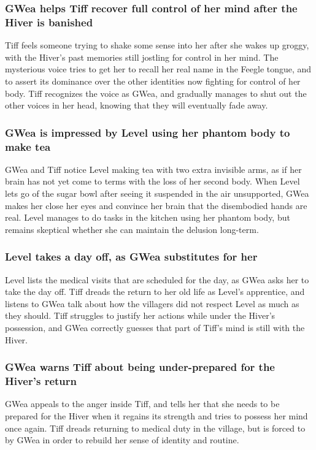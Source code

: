\subsubsection{\Gls{GWea} helps \Gls{Tiff} recover full control of her mind after the \Gls{Hiver}
    is banished}
\Gls{Tiff} feels someone trying to shake some sense into her after she wakes up groggy, with the
\Gls{Hiver}'s past memories still jostling for control in her mind. The mysterious voice tries to
get her to recall her real name in the Feegle tongue, and to assert its dominance over the other
identities now fighting for control of her body. \Gls{Tiff} recognizes the voice as \Gls{GWea}, and
gradually manages to shut out the other voices in her head, knowing that they will eventually fade
away.

\subsubsection{\Gls{GWea} is impressed by \Gls{Level} using her phantom body to make tea}
\Gls{GWea} and \Gls{Tiff} notice \Gls{Level} making tea with two extra invisible arms, as if her
brain has not yet come to terms with the loss of her second body. When \Gls{Level} lets go of the
sugar bowl after seeing it suspended in the air unsupported, \Gls{GWea} makes her close her eyes
and convince her brain that the disembodied hands are real. \Gls{Level} manages to do tasks in the
kitchen using her phantom body, but remains skeptical whether she can maintain the delusion
long-term.

\subsubsection{\Gls{Level} takes a day off, as \Gls{GWea} substitutes for her}
\Gls{Level} lists the medical visits that are scheduled for the day, as \Gls{GWea} asks her to take
the day off. \Gls{Tiff} dreads the return to her old life as \Gls{Level}'s apprentice, and listens
to \Gls{GWea} talk about how the villagers did not respect \Gls{Level} as much as they should.
\Gls{Tiff} struggles to justify her actions while under the \Gls{Hiver}'s possession, and \Gls{GWea}
correctly guesses that part of \Gls{Tiff}'s mind is still with the \Gls{Hiver}.

\subsubsection{\Gls{GWea} warns \Gls{Tiff} about being under-prepared for the \Gls{Hiver}'s return}
\Gls{GWea} appeals to the anger inside \Gls{Tiff}, and tells her that she needs to be prepared for
the \Gls{Hiver} when it regains its strength and tries to possess her mind once again. \Gls{Tiff}
dreads returning to medical duty in the village, but is forced to by \Gls{GWea} in order to rebuild
her sense of identity and routine.

